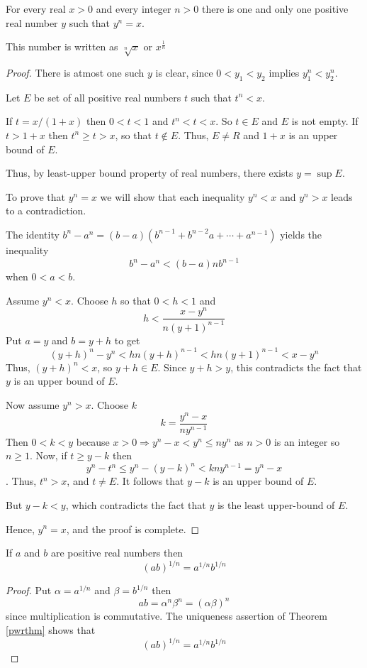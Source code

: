 \begin{thm}
    \label{pwrthm}
    For every real $x > 0$ and every integer $n > 0$ there is one and only one
    positive real number $y$ such that $y^n = x$.

    This number is written as $\sqrt[n]{x}$ or $x^{\frac{1}{n}}$
    \begin{proof}
        There is atmost one such $y$ is clear, since $0 < y_1 < y_2$ implies $y_1^n < y_2^n$.

        Let $E$ be set of all positive real numbers $t$ such that $t^n < x$.
        
        If $t = x / (1 + x)$ then $0 < t < 1$ and $t^n < t < x$. So $t \in E$ and $E$ is not empty.
        If $t > 1 + x$ then $t^n \geq t > x$, so that $t \notin E$. 
        Thus, $E \neq R$ and $1 + x$ is an upper bound of $E$.
        
        Thus, by least-upper bound property of real numbers, there exists $y = \sup E$.

        To prove that $y^n = x$ we will show that each inequality $y^n < x$ and $y^n > x$ leads to a contradiction.

        The identity $b^n - a^n = (b - a)(b^{n-1} + b^{n-2}a + \cdots + a^{n-1} )$ yields the inequality 
        $$ b^n - a^n < (b - a) n b^{n-1} $$
        when $0 < a < b$.

        Assume $y^n < x$. Choose $h$ so that $0 < h < 1$ and 
        $$ h < \frac{x - y^n}{n(y+1)^{n-1}} $$
        Put $a = y$ and $b = y + h$ to get 
        $$ (y + h)^n - y^n <  hn(y+h)^{n-1} < hn(y+1)^{n-1} < x - y^n $$
        Thus, $(y + h)^n < x$, so $y + h \in E$. 
        Since $y + h > y$, this contradicts the fact that $y$ is an upper bound of $E$.

        Now assume $y^n > x$. Choose $k$
        $$ k = \frac{y^n - x}{ny^{n-1}} $$
        Then $0 < k < y$ because $x > 0 \Rightarrow y^n - x < y^n \leq ny^n$ as $n > 0$ is an integer so $n \geq 1$.
        Now, if $t \geq y - k$ then 
        $$ y^n - t^n \leq y^n - (y-k)^n < kny^{n-1} = y^n - x $$.
        Thus, $t^n > x$, and $t \neq E$. It follows that $y - k$ is an upper bound of $E$.

        But $y - k < y$, which contradicts the fact that $y$ is the least upper-bound of $E$.

        Hence, $y^n = x$, and the proof is complete.
    \end{proof}
\end{thm}

\begin{cor}
    If $a$ and $b$ are positive real numbers then $$(ab)^{1/n} = a^{1/n} b^{1/n}$$
    \begin{proof}
        Put $\alpha = a^{1/n}$ and $\beta = b^{1/n}$ then $$ ab = \alpha^n \beta^n = (\alpha \beta)^n $$
        since multiplication is commutative. The uniqueness assertion of Theorem \ref{pwrthm} shows that 
        $$ (ab)^{1/n} = a^{1/n} b^{1/n} $$
    \end{proof}
\end{cor}


